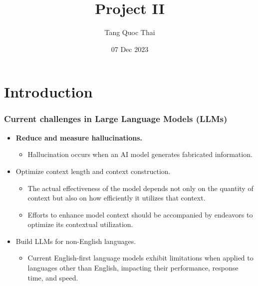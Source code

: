 \documentclass{beamer}
\title[Project II]{Project II} %
\author[Tang Quoc Thai]{\texorpdfstring{{\normalsize Tang Quoc Thai}}{Author}}
\institute[2270376] %
{

{\small Supervisor}\\
\medskip
{\small Assoc.\ Prof.\ Quan Thanh Tho}\\
\vspace{2cm}
\medskip
Ho Chi Minh City\\
University of Technology %

}
\date{07 Dec 2023} %
\newcounter{cont}
\begin{document}

\begin{frame}
\titlepage%
\end{frame}



\section{Introduction}
\begin{frame}[allowframebreaks]
\frametitle{Current challenges in Large Language Models (LLMs)}
  \begin{itemize}
    \item \textbf{Reduce and measure hallucinations.}~\cite{kaddour2023challenges}
    \begin{itemize}
        \item Hallucination occurs when an AI model generates fabricated information.
    \end{itemize}
    \item Optimize context length and context construction.~\cite{kaddour2023challenges}
    \begin{itemize}
      \item The actual effectiveness of the model depends not only on the quantity of context but also on how efficiently it utilizes that context.
      \item Efforts to enhance model context should be accompanied by endeavors to optimize its contextual utilization.
    \end{itemize}
    \item Build LLMs for non-English languages.~\cite{kaddour2023challenges}
    \begin{itemize}
      \item Current English-first language models exhibit limitations when applied to languages other than English, impacting their performance, response time, and speed.
    \end{itemize}
  \end{itemize}
\end{frame}
\end{document}
